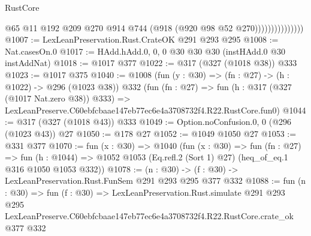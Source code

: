\begin{lexlean}{RustCore}
\begin{coremodule}
                              @65
                              @11
                              @192
                              @209
                              @270
                              @914
                              @744
                              (@918 (@920 @98 @52 @270)))))))))))))))
@1007 := LexLeanPreservation.Rust.CrateOK @291 @293 @295
@1008 := Nat.casesOn.{0}
@1017 := HAdd.hAdd.{0, 0, 0} @30 @30 @30 (instHAdd.{0} @30 instAddNat)
@1018 := @1017 @377
@1022 := @317 (@327 (@1018 @38)) @333
@1023 := @1017 @375
@1040 := @1008
    (fun (y : @30) => (fn : @27) -> (h : @1022) -> @296 (@1023 @38))
    @332
    (fun (fn : @27) =>
    fun (h : @317 (@327 (@1017 Nat.zero @38)) @333) =>
    LexLeanPreserve.C60ebfcbaae147eb77ec6e4a3708732f4.R22.RustCore.fun0)
@1044 := @317 (@327 (@1018 @43)) @333
@1049 := Option.noConfusion.{0, 0} (@296 (@1023 @43)) @27
@1050 := @178 @27
@1052 := @1049 @1050 @27
@1053 := @331 @377
@1070 := fun (x : @30) =>
  @1040
    (fun (x : @30) =>
    fun (fn : @27) =>
    fun (h : @1044) => @1052 @1053 (Eq.refl.{2} (Sort 1) @27) (heq_of_eq.{1} @316 @1050 @1053 @332))
@1078 := (n : @30) -> (f : @30) -> LexLeanPreservation.Rust.FunSem @291 @293 @295 @377 @332
@1088 := fun (n : @30) =>
  fun (f : @30) =>
  LexLeanPreservation.Rust.simulate
    @291
    @293
    @295
    LexLeanPreserve.C60ebfcbaae147eb77ec6e4a3708732f4.R22.RustCore.crate_ok
    @377
    @332
\end{coremodule}
\end{lexlean}
